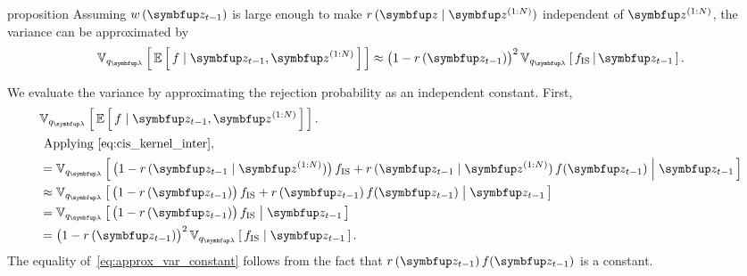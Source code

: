
\begin{theoremEnd}{proposition}\label{thm:approx_var}
  Assuming \(w\,(\vz_{t-1})\) is large enough to make \(r\,(\vz\mid\vz^{(1:N)})\) independent of \(\vz^{(1:N)}\), the variance can be approximated by
  \begin{align}
    \Vsub{q_{\vlambda}}{ \E{ f \mid \vz_{t-1}, \vz^{(1:N)} } } \approx {\big(1 - r\,(\vz_{t-1})\big)}^2\,\Vsub{q_{\vlambda}}{ f_{\text{IS}} \,\middle\vert\, \vz_{t-1} }.
  \end{align}
\end{theoremEnd}
\begin{proofEnd}
  We evaluate the variance by approximating the rejection probability as an independent constant.
  First,
  \begin{align}
    &\Vsub{q_{\vlambda}}{ \E{ f \mid \vz_{t-1}, \vz^{(1:N)} } }. \\
    \intertext{
      Applying~\eqref{eq:cis_kernel_inter},
    }
    &= \Vsub{q_{\vlambda}}{ \big(1 - r\,(\vz_{t-1}\mid\vz^{(1:N)})\big)\, f_{\mathrm{IS}}
      + r\,(\vz_{t-1}\mid\vz^{(1:N)})\,f(\vz_{t-1}) \;\middle\vert\; \vz_{t-1}} \\
    &\approx \Vsub{q_{\vlambda}}{ \big(1 - r\,(\vz_{t-1})\big)\, f_{\mathrm{IS}}
      + r\,(\vz_{t-1})\,f(\vz_{t-1}) \;\middle\vert\; \vz_{t-1}} \\
    &= \Vsub{q_{\vlambda}}{ \big(1 - r\,(\vz_{t-1})\big)\, f_{\mathrm{IS}} \;\middle\vert\; \vz_{t-1} } \label{eq:approx_var_constant} \\
    &= {\big(1 - r\,(\vz_{t-1})\big)}^2 \, \Vsub{q_{\vlambda}}{ f_{\mathrm{IS}} \;\middle\vert\; \vz_{t-1} }. \label{eq:approx_var_linear} 
  \end{align}
  The equality of~\eqref{eq:approx_var_constant} follows from the fact that \(r\,(\vz_{t-1})\,f(\vz_{t-1})\) is a constant.
\end{proofEnd}

